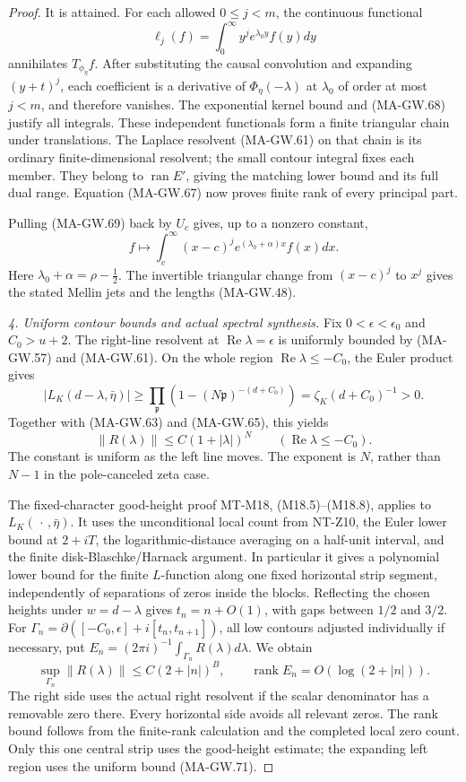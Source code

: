 \begin{proof}
It is attained.  For each allowed \(0\le j<m\), the
continuous functional
\[
                    \ell_j(f)=\int_0^\infty
                                   y^j e^{\lambda_0y}f(y)dy
 \tag{MA-GW.69}
\]
annihilates \(T_{\phi_\eta}f\).
After substituting the causal convolution and expanding
\((y+t)^j\), each coefficient is a derivative of
\(\Phi_\eta(-\lambda)\) at \(\lambda_0\) of order at most
\(j<m\), and therefore vanishes.  The exponential kernel
bound and (MA-GW.68) justify all integrals.
These independent functionals form a finite triangular
chain under translations.  The Laplace resolvent
(MA-GW.61) on that chain is its ordinary finite-dimensional
resolvent; the small contour integral fixes each member.
They belong to \(\operatorname{ran}E'\), giving the
matching lower bound and its full dual range.
Equation (MA-GW.67) now proves finite rank of every
principal part.

Pulling (MA-GW.69) back by \(U_c\) gives, up to a nonzero
constant,
\[
 f\longmapsto\int_c^\infty
             (x-c)^j e^{(\lambda_0+\alpha)x}f(x)dx .
 \tag{MA-GW.70}
\]
Here \(\lambda_0+\alpha=\rho-\tfrac12\).
The invertible triangular change from \((x-c)^j\) to
\(x^j\) gives the stated Mellin jets and the lengths
(MA-GW.48).

\emph{4. Uniform contour bounds and actual spectral synthesis.}
Fix \(0<\epsilon<\epsilon_0\) and \(C_0>u+2\).
The right-line resolvent at \(\operatorname{Re}\lambda=\epsilon\)
is uniformly bounded by (MA-GW.57) and (MA-GW.61).
On the whole region \(\operatorname{Re}\lambda\le-C_0\),
the Euler product gives
\[
 |L_K(d-\lambda,\bar\eta)|
   \ge\prod_{\mathfrak p}(1-(N\mathfrak p)^{-(d+C_0)})
   =\zeta_K(d+C_0)^{-1}>0 .
\]
Together with (MA-GW.63) and (MA-GW.65), this yields
\[
                   \|R(\lambda)\|\le C(1+|\lambda|)^N
                         \qquad(\operatorname{Re}\lambda\le-C_0).
 \tag{MA-GW.71}
\]
The constant is uniform as the left line moves.
The exponent is \(N\), rather than \(N-1\) in the
pole-canceled zeta case.

The fixed-character good-height proof MT-M18,
(M18.5)--(M18.8), applies to \(L_K(\,\cdot\,,\bar\eta)\).
It uses the unconditional local count from NT-Z10,
the Euler lower bound at \(2+iT\), the logarithmic-distance
averaging on a half-unit interval, and the finite
disk-Blaschke/Harnack argument.  In particular it gives a
polynomial lower bound for the finite \(L\)-function along
one fixed horizontal strip segment, independently of
separations of zeros inside the blocks.
Reflecting the chosen heights under \(w=d-\lambda\)
gives \(t_n=n+O(1)\), with gaps between \(1/2\) and \(3/2\).
For
\(\Gamma_n=\partial([-C_0,\epsilon]+i[t_n,t_{n+1}])\),
all low contours adjusted individually if necessary,
put \(E_n=(2\pi i)^{-1}\int_{\Gamma_n}R(\lambda)d\lambda\).
We obtain
\[
 \sup_{\Gamma_n}\|R(\lambda)\|\le C(2+|n|)^B,\qquad
 \operatorname{rank}E_n=O(\log(2+|n|)).
 \tag{MA-GW.72}
\]
The right side uses the actual right resolvent if the
scalar denominator has a removable zero there.
Every horizontal side avoids all relevant zeros.
The rank bound follows from the finite-rank calculation
and the completed local zero count.
Only this one central strip uses the good-height estimate;
the expanding left region uses the uniform bound
(MA-GW.71).


\end{proof}
